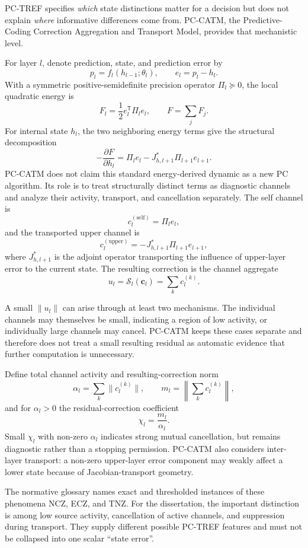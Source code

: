 PC-TREF specifies \emph{which} state distinctions matter for a decision but does not
explain \emph{where} informative differences come from. PC-CATM, the
Predictive-Coding Correction Aggregation and Transport Model, provides that
mechanistic level.

For layer $l$, denote prediction, state, and prediction error by
\[
  p_l=f_l(h_{l-1};\theta_l),\qquad e_l=p_l-h_l.
\]
With a symmetric positive-semidefinite precision operator $\Pi_l\succeq0$, the local
quadratic energy is
\[
  F_l=\frac12 e_l^{\mathsf T}\Pi_l e_l,\qquad F=\sum_j F_j.
\]
For internal state $h_l$, the two neighboring energy terms give the structural
decomposition
\[
  -\frac{\partial F}{\partial h_l}
  =\Pi_l e_l-J_{h,l+1}^{*}\Pi_{l+1}e_{l+1}.
\]
PC-CATM does not claim this standard energy-derived dynamic as a new PC algorithm. Its
role is to treat structurally distinct terms as diagnostic channels and analyze their
activity, transport, and cancellation separately. The self channel is
\[
  c_l^{(\mathrm{self})}=\Pi_l e_l,
\]
and the transported upper channel is
\[
  c_l^{(\mathrm{upper})}
  =-J_{h,l+1}^{*}\Pi_{l+1}e_{l+1},
\]
where $J_{h,l+1}^{*}$ is the adjoint operator transporting the influence of upper-layer
error to the current state. The resulting correction is the channel aggregate
\[
  u_l=\mathcal S_l(\mathbf c_l)=\sum_k c_l^{(k)}.
\]

A small $\|u_l\|$ can arise through at least two mechanisms. The individual channels
may themselves be small, indicating a region of low activity, or individually large
channels may cancel. PC-CATM keeps these cases separate and therefore does not treat a
small resulting residual as automatic evidence that further computation is unnecessary.

Define total channel activity and resulting-correction norm
\[
  \alpha_l=\sum_k\|c_l^{(k)}\|,
  \qquad
  m_l=\left\|\sum_k c_l^{(k)}\right\|,
\]
and for $\alpha_l>0$ the residual-correction coefficient
\[
  \chi_l=\frac{m_l}{\alpha_l}.
\]
Small $\chi_l$ with non-zero $\alpha_l$ indicates strong mutual cancellation, but
remains diagnostic rather than a stopping permission. PC-CATM also considers
inter-layer transport: a non-zero upper-layer error component may weakly affect a lower
state because of Jacobian-transport geometry.

The normative glossary names exact and thresholded instances of these phenomena NCZ,
ECZ, and TNZ. For the dissertation, the important distinction is among low source
activity, cancellation of active channels, and suppression during transport. They
supply different possible PC-TREF features and must not be collapsed into one scalar
``state error''.

